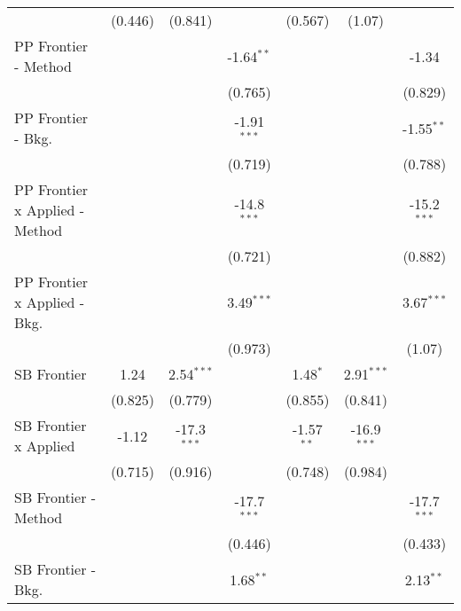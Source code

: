 \begin{tabular}{lcccccc}
                                  & (0.446)      & (0.841)       &               & (0.567)      & (1.07)        &   \\   
   PP Frontier - Method           &              &               & -1.64$^{**}$  &              &               & -1.34\\   
                                  &              &               & (0.765)       &              &               & (0.829)\\   
   PP Frontier - Bkg.             &              &               & -1.91$^{***}$ &              &               & -1.55$^{**}$\\   
                                  &              &               & (0.719)       &              &               & (0.788)\\   
   PP Frontier x Applied - Method &              &               & -14.8$^{***}$ &              &               & -15.2$^{***}$\\   
                                  &              &               & (0.721)       &              &               & (0.882)\\   
   PP Frontier x Applied - Bkg.   &              &               & 3.49$^{***}$  &              &               & 3.67$^{***}$\\   
                                  &              &               & (0.973)       &              &               & (1.07)\\   
   SB Frontier                    & 1.24         & 2.54$^{***}$  &               & 1.48$^{*}$   & 2.91$^{***}$  &   \\   
                                  & (0.825)      & (0.779)       &               & (0.855)      & (0.841)       &   \\   
   SB Frontier x Applied          & -1.12        & -17.3$^{***}$ &               & -1.57$^{**}$ & -16.9$^{***}$ &   \\   
                                  & (0.715)      & (0.916)       &               & (0.748)      & (0.984)       &   \\   
   SB Frontier - Method           &              &               & -17.7$^{***}$ &              &               & -17.7$^{***}$\\   
                                  &              &               & (0.446)       &              &               & (0.433)\\   
   SB Frontier - Bkg.             &              &               & 1.68$^{**}$   &              &               & 2.13$^{**}$\\   

\end{tabular}
